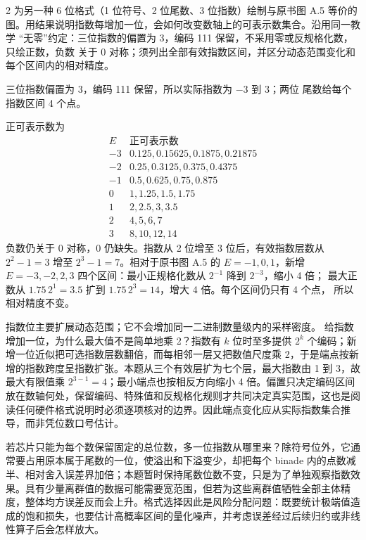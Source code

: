 \begin{solutionexercise}{2}
\problemheading 为另一种 6 位格式（1 位符号、2 位尾数、3 位指数）绘制与原书图 A.5
等价的图。用结果说明指数每增加一位，会如何改变数轴上的可表示数集合。沿用同一教学
“无零”约定：三位指数的偏置为 3，编码 111 保留，不采用零或反规格化数，只绘正数，负数
关于 0 对称；须列出全部有效指数区间，并区分动态范围变化和每个区间内的相对精度。

\approachheading 三位指数偏置为 3，编码 111 保留，所以实际指数为 $-3$ 到 $3$；两位
尾数给每个指数区间 4 个点。

\answerheading 正可表示数为
\[
\begin{array}{c|l}
E&\text{正可表示数}\\ \hline
-3&0.125,0.15625,0.1875,0.21875\\
-2&0.25,0.3125,0.375,0.4375\\
-1&0.5,0.625,0.75,0.875\\
0&1,1.25,1.5,1.75\\
1&2,2.5,3,3.5\\
2&4,5,6,7\\
3&8,10,12,14
\end{array}
\]
负数仍关于 0 对称，0 仍缺失。指数从 2 位增至 3 位后，有效指数层数从
$2^2-1=3$ 增至 $2^3-1=7$。相对于原书图 A.5 的 $E=-1,0,1$，新增
$E=-3,-2,2,3$ 四个区间：最小正规格化数从 $2^{-1}$ 降到 $2^{-3}$，缩小 4 倍；
最大正数从 $1.75\,2^1=3.5$ 扩到 $1.75\,2^3=14$，增大 4 倍。每个区间仍只有 4 个点，
所以相对精度不变。

\conclusionheading 指数位主要扩展动态范围；它不会增加同一二进制数量级内的采样密度。
\discussionheading
{}
给指数增加一位，为什么最大值不是简单地乘 2？指数有 $k$ 位时至多提供 $2^k$ 个编码；新增一位近似把可选指数层数翻倍，而每相邻一层又把数值尺度乘 2，于是端点按新增的指数跨度呈指数扩张。本题从三个有效层扩为七个层，最大指数由 1 到 3，故最大有限值乘 $2^{3-1}=4$；最小端点也按相反方向缩小 4 倍。偏置只决定编码区间放在数轴何处，保留编码、特殊值和反规格化规则才共同决定真实范围，这也是阅读任何硬件格式说明时必须逐项核对的边界。因此端点变化应从实际指数集合推导，而非凭位数口号估计。

若芯片只能为每个数保留固定的总位数，多一位指数从哪里来？除符号位外，它通常要占用原本属于尾数的一位，使溢出和下溢变少，却把每个 binade 内的点数减半、相对舍入误差界加倍；本题暂时保持尾数位数不变，只是为了单独观察指数效果。具有少量离群值的数据可能需要宽范围，但若为这些离群值牺牲全部主体精度，整体均方误差反而会上升。格式选择因此是风险分配问题：既要统计极端值造成的饱和损失，也要估计高概率区间的量化噪声，并考虑误差经过后续归约或非线性算子后会怎样放大。


\end{solutionexercise}
